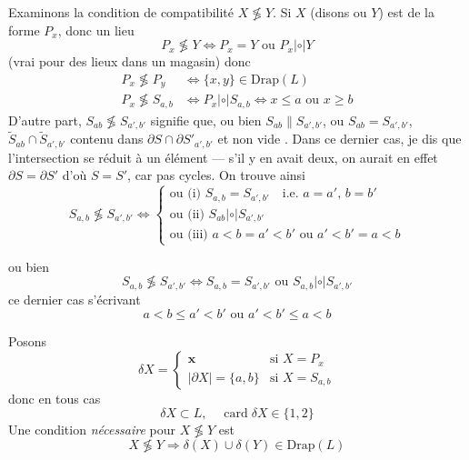 \documentclass[11pt,a4paper]{article}
\begin{document}
Examinons la condition de compatibilité $X\not\lessgtr Y$. Si $X$ (disons ou $Y$) est de la forme $P_x$, donc un lieu
\[
P_x \not\lessgtr Y \Longleftrightarrow P_x = Y \text{ ou } P_x \mathrel{|{\circ}|} Y
\]
(vrai pour des lieux dans un magasin)  donc
\[
\begin{aligned}
P_x \not\lessgtr P_y &\Longleftrightarrow \{x,y\}\in\mathrm{Drap}(L)\\
P_x \not\lessgtr S_{a,b} &\Longleftrightarrow P_x \mathrel{|{\circ}|} S_{a,b} \Longleftrightarrow x\le a \text{ ou } x\ge b
\end{aligned}
\]
D'autre part, $S_{ab}\not\lessgtr S_{a',b'}$ signifie que, ou bien $S_{ab}\parallel S_{a',b'}$, ou $S_{ab} = S_{a',b'}$,  $\widetilde{S}_{ab} \cap \widetilde{S}_{a',b'}$ contenu dans $\partial S \cap \partial S'_{a',b'}$ et non vide . Dans ce dernier cas, je dis que l'intersection   se réduit à un   élément — s'il y en avait deux, on aurait en effet $\partial S = \partial S'$ d'où $S = S'$, car pas \ill{} \ill{} \ill{} cycles. On trouve ainsi
\[
S_{a,b}\not\lessgtr S_{a',b'} \Longleftrightarrow
\begin{cases}
\text{ou (i) } S_{a,b} = S_{a',b'} \quad \text{i.e. } a = a',\, b = b'\\
\text{ou (ii) } S_{ab} \mathrel{|{\circ}|} S_{a',b'}\\
\text{ou (iii) } a<b = a'<b' \text{ ou } a'<b' = a<b
\end{cases}
\]

ou bien
\[
S_{a,b}\not\lessgtr S_{a',b'} \Longleftrightarrow S_{a,b} = S_{a',b'} \text{ ou } S_{a,b} \mathrel{|{\circ}|} S_{a',b'}
\]
 ce dernier cas s'écrivant
\[
a<b\le a'<b' \text{ ou } a'<b'\le a<b
\]


Posons
\[
\delta X =
\begin{cases}
\mathbf{x} & \text{si } X = P_x\\
|\partial X| = \{a,b\} & \text{si } X = S_{a,b}
\end{cases}
\]
donc en tous cas
\[
\delta X \subset L, \quad \operatorname{card}\delta X \in \{1,2\}
\]
 Une condition \textit{nécessaire} pour $X\not\lessgtr Y$ est
\[
X\not\lessgtr Y \Longrightarrow \delta(X)\cup\delta(Y) \in \mathrm{Drap}(L)
\]
\end{document}
